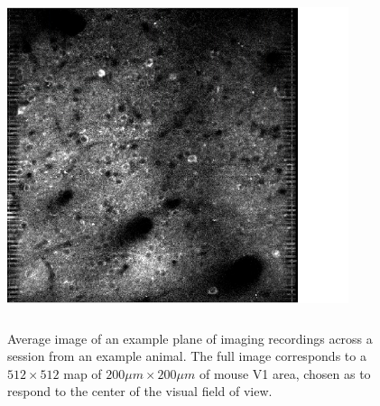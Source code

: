 \begin{figure}[H] \centering \includegraphics[width=10cm,height=10cm,keepaspectratio]{Figures/7.Results/ftraces/CM006.png} 
\caption{Average image of an example plane of imaging recordings across a session from an example animal. The full image corresponds to a $512\times 512$ map of $200 \mu m \times 200 \mu m$ of mouse V1 area, chosen as to respond to the center of the visual field of view.
\label{cm006}}
\end{figure}